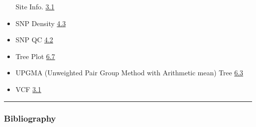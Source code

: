 \documentclass[
]{book}
\begin{document}
\begin{itemize}
  Site Info. \href{https://teddyenn.github.io/ShiNyP_guide.io/sec-data-input.html\#step-2-transform-to-data.frame}{3.1}
\item
  SNP Density \href{https://teddyenn.github.io/ShiNyP_guide.io/sec-data-qc.html\#snp-density}{4.3}
\item
  SNP QC \href{https://teddyenn.github.io/ShiNyP_guide.io/sec-data-qc.html\#snp-qc}{4.2}
\item
  Tree Plot \href{https://teddyenn.github.io/ShiNyP_guide.io/sec-population-structure.html\#tree-plot-plus}{6.7}
\item
  UPGMA (Unweighted Pair Group Method with Arithmetic mean) Tree \href{https://teddyenn.github.io/ShiNyP_guide.io/sec-population-structure.html\#upgma-unweighted-pair-group-method-with-arithmetic-mean-tree}{6.3}
\item
  VCF \href{https://teddyenn.github.io/ShiNyP_guide.io/sec-data-input.html\#vcf}{3.1}
\end{itemize}

\begin{center}\rule{0.5\linewidth}{0.5pt}\end{center}

\subsubsection*{Bibliography}\label{bibliography}

  
\end{document}
